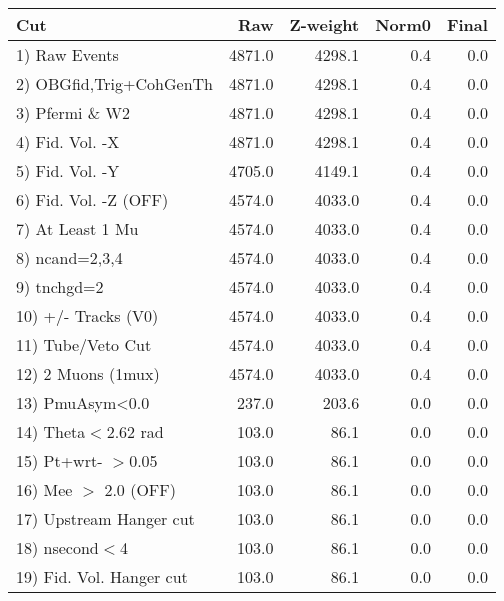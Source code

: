  \begin{table}[h!]\centering
 \begin{tabular}{||l||r|r|r|r||}
 \hline
 \hline
 Cut & Raw & Z-weight & Norm0 & Final \\
 \hline
  1) Raw Events           &      4871.0 &      4298.1 &         0.4 &         0.0 \\
  2) OBGfid,Trig+CohGenTh &      4871.0 &      4298.1 &         0.4 &         0.0 \\
  3) Pfermi \& W2         &      4871.0 &      4298.1 &         0.4 &         0.0 \\
  4) Fid. Vol. -X         &      4871.0 &      4298.1 &         0.4 &         0.0 \\
  5) Fid. Vol. -Y         &      4705.0 &      4149.1 &         0.4 &         0.0 \\
  6) Fid. Vol. -Z (OFF)   &      4574.0 &      4033.0 &         0.4 &         0.0 \\
  7) At Least 1 Mu        &      4574.0 &      4033.0 &         0.4 &         0.0 \\
  8) ncand=2,3,4          &      4574.0 &      4033.0 &         0.4 &         0.0 \\
  9) tnchgd=2             &      4574.0 &      4033.0 &         0.4 &         0.0 \\
 10) +/- Tracks (V0)      &      4574.0 &      4033.0 &         0.4 &         0.0 \\
 11) Tube/Veto Cut        &      4574.0 &      4033.0 &         0.4 &         0.0 \\
 12) 2 Muons (1mux)       &      4574.0 &      4033.0 &         0.4 &         0.0 \\
 13) PmuAsym<0.0          &       237.0 &       203.6 &         0.0 &         0.0 \\
 14) Theta$<$2.62 rad     &       103.0 &        86.1 &         0.0 &         0.0 \\
 15) Pt+wrt- $>$0.05      &       103.0 &        86.1 &         0.0 &         0.0 \\
 16) Mee $>$ 2.0  (OFF)   &       103.0 &        86.1 &         0.0 &         0.0 \\
 17) Upstream Hanger cut  &       103.0 &        86.1 &         0.0 &         0.0 \\
 18) nsecond$<$4          &       103.0 &        86.1 &         0.0 &         0.0 \\
 19) Fid. Vol. Hanger cut &       103.0 &        86.1 &         0.0 &         0.0 \\

\end{tabular}
\end{table}
